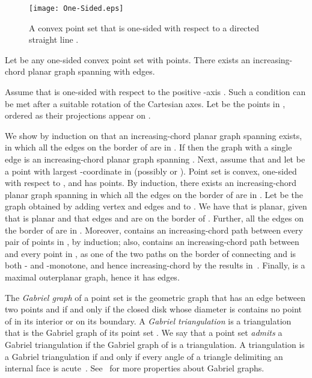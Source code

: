 \documentclass{llncs}
\renewenvironment{proof}
{{\bf Proof:}}{\hspace*{\fill}\par\vspace{2mm}}
\begin{document}
\begin{figure}[tb]
\begin{center}
\mbox{\texttt{[image: One-Sided.eps]}}
\caption{A convex point set that is one-sided with respect to a directed straight line .}
\label{fig:one-sided-x}
\end{center}
\end{figure}


\begin{lemma} \label{lemma:half_convex_planar_graph}
Let  be any one-sided convex point set with  points. There exists an increasing-chord planar graph spanning  with  edges.
\end{lemma}

\begin{proof}
Assume that  is one-sided with respect to the positive -axis . Such a condition can be met after a suitable rotation of the Cartesian axes. Let  be the points in , ordered as their projections appear on .

We show by induction on  that an increasing-chord planar graph  spanning  exists, in which all the edges on the border of  are in . If  then the graph with a single edge  is an increasing-chord planar graph spanning . Next, assume that  and let  be a point with largest -coordinate in  (possibly  or ). Point set  is convex, one-sided with respect to , and has  points. By induction, there exists an increasing-chord planar graph  spanning  in which all the edges on the border of  are in . Let  be the graph obtained by adding vertex  and edges  and  to . We have that  is planar, given that  is planar and that edges  and  are on the border of . Further, all the edges on the border of  are in . Moreover,  contains an increasing-chord path between every pair of points in , by induction; also,  contains an increasing-chord path between  and every point  in , as one of the two paths on the border of  connecting  and  is both - and -monotone, and hence increasing-chord by the results in~\cite{acglp-sag-12}. Finally,  is a maximal outerplanar graph, hence it has  edges.
\end{proof}

The {\em Gabriel graph} of a point set  is the geometric graph that has an edge  between two points  and  if and only if the closed disk whose diameter is  contains no point of  in its interior or on its boundary. A {\em Gabriel triangulation} is a triangulation that is the Gabriel graph of its point set . We say that a point set  {\em admits} a Gabriel triangulation if the Gabriel graph of  is a triangulation. A triangulation is a Gabriel triangulation if and only if every angle of a triangle delimiting an internal face is acute~\cite{gs-nsagva-69}. See~\cite{gs-nsagva-69,gd-handbook,ms-pgg-80} for more properties about Gabriel graphs.
\end{document}
